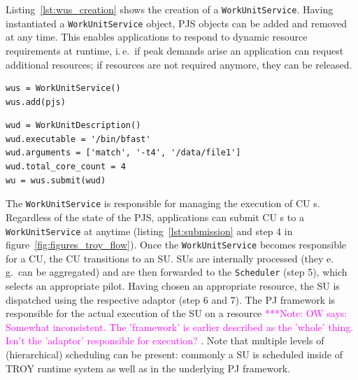 \documentclass[conference,final]{IEEEtran}
\newcommand{\note}[1]{ {\textcolor{magenta} { ***Note: #1 }}}
\newcommand{\note}[1]{}
\newcommand{\cu}{CU\xspace}
\begin{document}
Listing~\ref{lst:wus_creation} shows the creation of a \texttt{WorkUnitService}.
Having instantiated a \texttt{WorkUnitService} object, PJS objects can be added
and removed at any time. This enables applications to respond to dynamic
resource requirements at runtime, i.\,e.\ if peak demands arise an application
can request additional resources; if resources are not required anymore, they
can be released.

\noindent\begin{minipage}{0.47 \textwidth}
\begin{lstlisting}[caption={\textbf{WorkUnitService Creation:} Instantiation of 
	a \texttt{WorkUnitService} using a reference to the 
	\texttt{PilotJobService}.}, 
	label={lst:wus_creation}]
wus = WorkUnitService()
wus.add(pjs)
\end{lstlisting}
\end{minipage}

\noindent\begin{minipage}{0.47 \textwidth}
\begin{lstlisting}[caption={\textbf{WorkUnit Submission:} Instantiation and 
	submission of a \texttt{WorkUnitDescription}.}, label={lst:submission}] 
wud = WorkUnitDescription()
wud.executable = '/bin/bfast'
wud.arguments = ['match', '-t4', '/data/file1']
wud.total_core_count = 4
wu = wus.submit(wud)
\end{lstlisting}
\end{minipage}


The \texttt{WorkUnitService} is responsible for managing the execution of \cu s.
Regardless of the state of the PJS, applications can submit \cu s to a
\texttt{WorkUnitService} at anytime (listing~\ref{lst:submission} and step 4 in
figure~\ref{fig:figures_troy_flow}). Once the \texttt{WorkUnitService} becomes
responsible for a \cu, the \cu  transitions to an SU. SUs are internally processed
(they e.\,g.\ can be aggregated) and are then forwarded to the
\texttt{Scheduler} (step 5), which selects an appropriate pilot. Having chosen
an appropriate resource, the SU is dispatched using the respective adaptor (step
6 and 7). The PJ framework is responsible for the actual execution of the SU on
a resource
\note{OW says: Somewhat inconsistent. The 'framework' is earlier described as 
the 'whole' thing. Isn't the 'adaptor' responsible for execution?}. 
Note that multiple levels of (hierarchical) scheduling can be
present: commonly a SU is scheduled inside of TROY runtime system as well as in
the underlying PJ framework.
\end{document}
